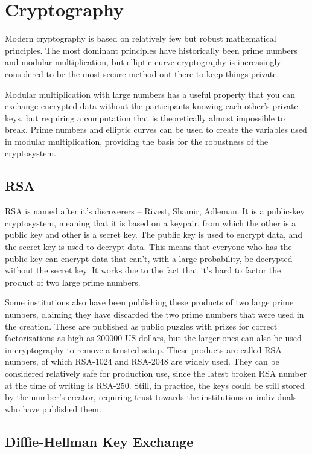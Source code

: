 \chapter{Cryptography}
\label{Cryptography}

Modern cryptography is based on relatively few but robust mathematical principles. The most dominant principles have historically been prime numbers and modular multiplication, but elliptic curve cryptography is increasingly considered to be the most secure method out there to keep things private.

Modular multiplication with large numbers has a useful property that you can exchange encrypted data without the participants knowing each other's private keys, but requiring a computation that is theoretically almost impossible to break. Prime numbers and elliptic curves can be used to create the variables used in modular multiplication, providing the basis for the robustness of the cryptosystem.

\section{RSA}

RSA is named after it's discoverers – Rivest, Shamir, Adleman. It is a public-key cryptosystem, meaning that it is based on a keypair, from which the other is a public key and other is a secret key. The public key is used to encrypt data, and the secret key is used to decrypt data. This means that everyone who has the public key can encrypt data that can't, with a large probability, be decrypted without the secret key. It works due to the fact that it's hard to factor the product of two large prime numbers.

Some institutions also have been publishing these products of two large prime numbers, claiming they have discarded the two prime numbers that were used in the creation. These are published as public puzzles with prizes for correct factorizations as high as 200000 US dollars, but the larger ones can also be used in cryptography to remove a trusted setup. These products are called RSA numbers, of which RSA-1024 and RSA-2048 are widely used. They can be considered relatively safe for production use, since the latest broken RSA number at the time of writing is RSA-250. Still, in practice, the keys could be still stored by the number's creator, requiring trust towards the institutions or individuals who have published them.

\section{Diffie-Hellman Key Exchange}

